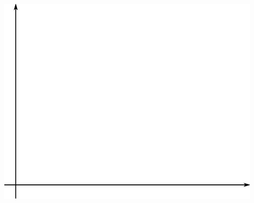 \documentclass[11pt]{article}
\begin{document}
\begin{itemize}
	\includegraphics[scale=0.4]{lecture1_fig2.png}\\	


\end{itemize}


	
\end{document}
